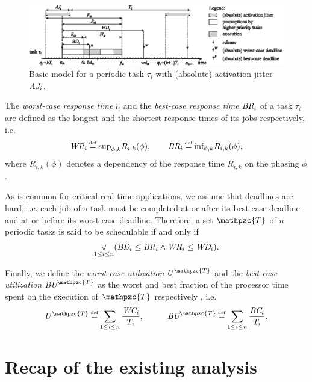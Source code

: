 \begin{figure}[t]
	\includegraphics[width=1\linewidth]{figures/model2}
	\caption{Basic model for a periodic task $\tau_i$ with (absolute) activation jitter $\mbox{\it AJ}_i$.}
	\label{fig:taskmodel}
\end{figure}

The \textit{worst-case response time} $\wr_i$ and the \textit{best-case response time} $\mbox{\it BR}_i$ of a task $\tau_i$ are defined as the longest and the shortest response times of its jobs respectively, i.e.
\begin{align*}
	\wr_i \defeq \text{sup}_{\phi,k} R_{i,k}(\phi),  \text{\hspace{7mm}}
	\br_i \defeq \text{inf}_{\phi,k} R_{i,k}(\phi),
\end{align*}
where $R_{i,k}(\phi)$ denotes a dependency of the response time $R_{i,k}$ on the phasing $\phi$.

As is common for critical real-time applications, we assume that deadlines are hard, i.e. each
job of a task must be completed at or after its best-case deadline and at or before its worst-case deadline. Therefore, a set $\mathpzc{T}$ of $n$ periodic tasks is said to be schedulable if and only if
\begin{align}
	\displaystyle\mathop{\forall}_{1 \leq i \leq n}(\mbox{\it BD}_i\leq \mbox{\it BR}_i \land \mbox{\it WR}_i \leq \mbox{\it WD}_i).
\end{align}

Finally, we define the \textit{worst-case utilization} $U^{\mathpzc{T}}$ and the \textit{best-case utilization} $\bu^{\mathpzc{T}}$ as the worst and best fraction of the  processor time spent on the execution of $\mathpzc{T}$ respectively \cite{LL73}, i.e.
\begin{align*}
	U^{\mathpzc{T}} \defeq \sum_{1\leq i \leq n} \frac{\wc_i}{T_i}, \text{\hspace{10mm}} \bu^{\mathpzc{T}} \defeq \sum_{1\leq i \leq n} \frac{\bc_i}{T_i}.
\end{align*} 

\section{Recap of the existing analysis}

